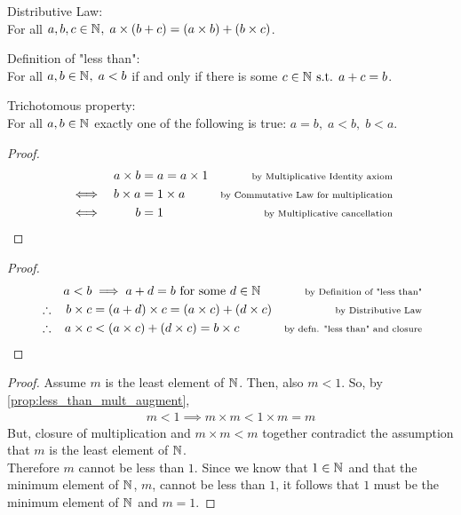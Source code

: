 \documentclass[../MathsNotesBase.tex]{subfiles}
\begin{document}
{		\begin{axiom}{Distributive Law:}\\ For all $a,b,c \in \mathbb{N}^{},\; a \times (b + c) = (a \times b) + (b \times c)$.
		\end{axiom}
		\begin{axiom}{Definition of "less than":}\\ For all $a,b \in \mathbb{N}^{},\; a < b$ if and only if there is some $c \in \mathbb{N}^{} \text{ s.t. } a + c = b$.
		\end{axiom}
		\begin{axiom}{Trichotomous property:}\\ For all $a,b \in \mathbb{N}^{}$ exactly one of the following is true: $a = b,\; a < b,\; b < a$.
		\end{axiom}
	
		\bigskip
				
			\begin{proof}
			\begin{align*}
			&& a \times b &= a = a \times 1 &\text{\scriptsize{by Multiplicative Identity axiom}}\\
			&\iff & b \times a &= 1 \times a  &\text{\scriptsize{by Commutative Law for multiplication}}\\
			&\iff & b &= 1  &\text{\scriptsize{by Multiplicative cancellation}}\\
			\end{align*}
			\end{proof}
		
			\begin{proof}
			\begin{align*}
			&& a < b &\implies a + d = b \text{ for some } d \in \mathbb{N}^{} &\text{\scriptsize{by Definition of "less than"}}\\
			&\therefore & b \times c &= (a + d) \times c = (a \times c) + (d \times c)  &\text{\scriptsize{by Distributive Law}}\\
			&\therefore & a \times c &< (a \times c) + (d \times c) = b \times c  &\text{\scriptsize{by defn. "less than" and closure}}
			\end{align*}
			\end{proof}
		
		\begin{proof}
			Assume $m$ is the least element of $\mathbb{N}^{}$. Then, also $m < 1$. So, by \autoref{prop:less_than_mult_augment},
			\begin{align*}
			m < 1 \implies m \times m < 1 \times m = m
			\end{align*}
			But, closure of multiplication and $m \times m < m$ together contradict the assumption that $m$ is the least element of $\mathbb{N}^{}$.\\
			Therefore $m$ cannot be less than $1$. Since we know that $1 \in \mathbb{N}^{}$ and that the minimum element of $\mathbb{N}^{}$, $m$, cannot be less than $1$, it follows that $1$ must be the minimum element of $\mathbb{N}^{}$ and $m = 1$.
		\end{proof}
	}
\end{document}
